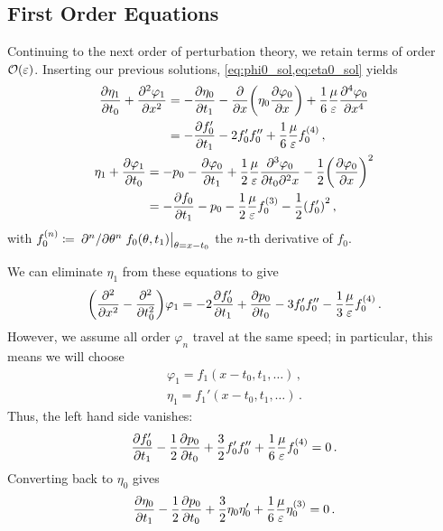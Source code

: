 \documentclass{jfm}
\renewcommand*{\epsilon}{\varepsilon}
\begin{document}
\subsection{\label{sec:int_first_order} First Order Equations}
Continuing to the next order of perturbation theory, we retain terms of
order $\order{\epsilon}$.
Inserting our previous solutions, \cref{eq:phi0_sol,eq:eta0_sol} yields
\begin{gather}
  \begin{aligned}
    \pdv{\eta_1}{t_0} + \pdv[2]{\varphi_{1}}{x} &=
      -\pdv{\eta_0}{t_1} - \pdv{x} \pqty{\eta_0 \pdv{\varphi_0}{x}} +
      \frac{1}{6} \frac{\mu}{\epsilon} \pdv[4]{\varphi_0}{x} \\
      &= -\pdv{f_0'}{t_1} - 2 f_0' f_0'' + \frac{1}{6}
      \frac{\mu}{\epsilon} f_0^{(4)} \,,
  \end{aligned}
  \\
  \begin{aligned}
    \eta_1 + \pdv{\varphi_1}{t_0} &= -p_0 -\pdv{\varphi_0}{t_1}
      + \frac{1}{2} \frac{\mu}{\epsilon} \frac{\partial^3 \varphi_0}
        {\partial t_0 \partial^2 x}
      - \frac{1}{2} \pqty{ \pdv{\varphi_0}{x} }^2 \\
    &= -\pdv{f_0}{t_1} - p_0 - \frac{1}{2} \frac{\mu}{\epsilon}
      f_0^{(3)} - \frac{1}{2} \pqty{f_0'}^2 \,,
  \end{aligned}
\end{gather}
with $f_0^{(n)} \coloneqq \eval{\pdv*[n]{\theta}
f_0(\theta,t_1)}_{\theta=x-t_0}$ the $n$-th derivative of $f_0$.

We can eliminate $\eta_1$ from these equations to give
\begin{equation}
  \pqty{\pdv[2]{x} - \pdv[2]{t_0}} \varphi_1 = -2 \pdv{f_0'}{t_1} +
    \pdv{p_0}{t_0} - 3 f_0' f_0'' - \frac{1}{3} \frac{\mu}{\epsilon}
    f_0^{(4)} \,.
\end{equation}
However, we assume all order $\varphi_{n}$ travel at the same speed; in
particular, this means we will choose
\begin{align}
  \varphi_1 = f_1(x-t_0,t_1,\ldots) \,, \label{eq:phi1_sol} \\
  \eta_1 = f_1'(x-t_0,t_1,\ldots) \,. \label{eq:eta1_sol}
\end{align}
Thus, the left hand side vanishes:
\begin{equation}
  \pdv{f_0'}{t_1} - \frac{1}{2} \pdv{p_0}{t_0} + \frac{3}{2} f_0' f_0''
    + \frac{1}{6} \frac{\mu}{\epsilon} f_0^{(4)} = 0\,.
\end{equation}
Converting back to $\eta_0$ gives
\begin{equation}
  \pdv{\eta_0}{t_1} - \frac{1}{2} \pdv{p_0}{t_0} + \frac{3}{2} \eta_0
  \eta_0' + \frac{1}{6} \frac{\mu}{\epsilon} \eta_0^{(3)} = 0\,.
\end{equation}
\end{document}
